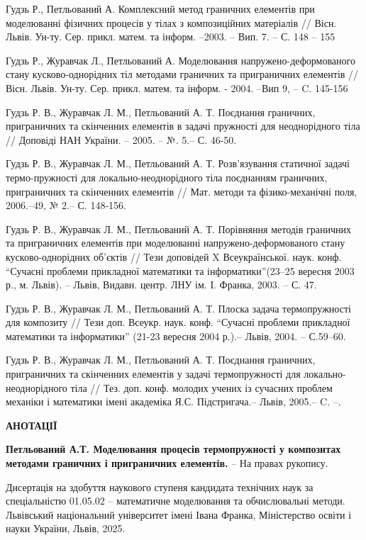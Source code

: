 Гудзь Р., Петльований А. Комплексний метод граничних елементів при моделюванні фізичних процесів у тілах з композиційних
матеріалів // Вісн. Львів. Ун-ту. Сер. прикл. матем. та інформ. –2003. – Вип. 7. – С. 148 – 155

Гудзь Р., Журавчак Л., Петльований А. Моделювання напружено-деформованого  стану кусково-однорідних тіл методами
граничних та приграничних елементів // Вісн. Львів. Ун-ту. Сер. прикл. матем. та інформ. - 2004. –Вип 9, – C. 145-156

Гудзь Р. В., Журавчак Л. М., Петльований А. Т. Поєднання граничних, приграничних та скінченних елементів в задачі
пружності для неоднорідного тіла // Доповіді НАН України. – 2005. – №. 5.– С. 46-50.

Гудзь Р. В., Журавчак Л. М., Петльований А. Т. Розв’язування статичної задачі термо-пружності для локально-неоднорідного
тіла поєднанням граничних, приграничних та скінченних елементів // Мат. методи та фізико-механічні поля, 2006.–49, № 2.–
С. 148-156.

Гудзь Р. В., Журавчак Л. М., Петльований А. Т. Порівняння методів граничних та пригранич­них елементів при моделюванні
напружено-деформованого стану кусково-однорідних об’єктів // Тези доповідей X Всеукраїнської. наук. конф. “Сучасні
проблеми прикладної математики та інформатики”(23–25 вересня 2003 р., м. Львів). – Львів, Видавн. центр. ЛНУ ім. І.
Франка, 2003. – С. 47.

Гудзь Р. В., Журавчак Л. М., Петльований А. Т. Плоска задача термо­пружності для компози­ту // Тези доп. Всеукр. наук.
конф. “Сучасні проблеми прикладної математики та інформатики” (21-23 вересня 2004 р.).– Львів, 2004. – С.59–60. 

Гудзь Р. В., Журавчак Л. М., Петльований А. Т. Поєднання граничних, приграничних та скін­ченних елемен­тів  у задачі
термопружності для локально-неоднорідного тіла // Тез. доп. конф. молодих учених із су­часних проблем механіки і
математики імені академіка Я.С. Підстригача.– Львів, 2005.– C. –.

\begin{center}
    \textbf{АНОТАЦІЇ}
\end{center}

\textbf{Петльований А.Т. Моделювання процесів термопружності у композитах методами граничних і приграничних елементів.}
-- На правах рукопису. 

Дисертація на здобуття наукового ступеня кандидата технічних наук за спеціальністю 01.05.02 --
математичне моделювання та обчислювальні методи. Львівський національний університет імені Івана Франка, Міністерство
освіти і науки України, Львів, 2025.

